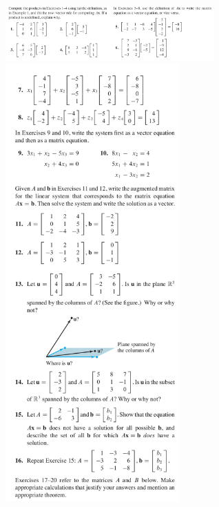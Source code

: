 \documentclass[a4paper,11pt,reqno]{amsart}
\numberwithin{equation}{section}
\begin{document}
\includegraphics[width=0.6\textwidth, height=0.2\textwidth]{exercises/me_1.png}\\
\includegraphics[width=0.5\textwidth, height=1.2\textwidth]{exercises/me_2.png}
\end{document}
